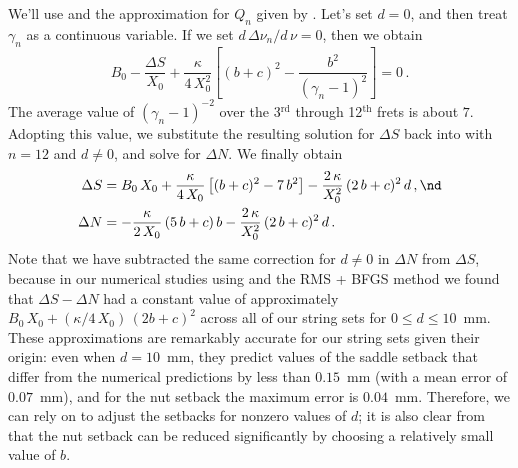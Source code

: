 We'll use  and the approximation for $Q_n$ given by . Let's set $d = 0$, and then treat $\gamma_n$ as a continuous variable. If we set $d\, \Delta \nu_n / d\, \nu = 0$, then we obtain
\begin{equation}
  B_0 - \frac{\Delta S}{X_0} + \frac{\kappa}{4\, X_0^2} \left[ (b + c)^2 - \frac{b^2}{(\gamma_n - 1)^2} \right] = 0\, .
\end{equation}
The average value of $(\gamma_n - 1)^{-2}$ over the 3$^\textrm{rd}$ through 12$^\textrm{th}$ frets is about $7$. Adopting this value, we substitute the resulting solution for $\Delta S$ back into  with $n = 12$ and $d \ne 0$, and solve for $\Delta N$. We finally obtain
\begin{subequations} \label{eqn:comp_approx}
  \begin{align}
    \label{eqn:comp_approx_ds} \Delta S &= B_0\, X_0 + \frac{\kappa}{4\, X_0} \left[(b + c)^2 - 7\, b^2\right] - \frac{2\, \kappa}{X_0^2}\, (2\, b + c)^2\, d\, , \nd \\
    \label{eqn:comp_approx_dn} \Delta N &= -\frac{\kappa}{2\, X_0}\, (5\, b + c)\, b - \frac{2\, \kappa}{X_0^2}\, (2\, b + c)^2\, d\, .
  \end{align}
\end{subequations}
Note that we have subtracted the same correction for $d \ne 0$ in $\Delta N$ from $\Delta S$, because in our numerical studies using  and the RMS + BFGS method we found that $\Delta S - \Delta N$ had a constant value of approximately $B_0\, X_0 + (\kappa/4\, X_0)\, (2 b + c)^2$ across all of our string sets for $0 \le d \le 10$~mm. These approximations are remarkably accurate for our string sets given their origin: even when $d = 10$~mm, they predict values of the saddle setback that differ from the numerical predictions by less than $0.15$~mm (with a mean error of $0.07$~mm), and for the nut setback the maximum error is $0.04$~mm. Therefore, we can rely on  to adjust the setbacks for nonzero values of $d$; it is also clear from  that the nut setback can be reduced significantly by choosing a relatively small value of $b$.


